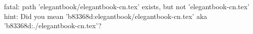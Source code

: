 fatal: path 'elegantbook/elegantbook-cn.tex' exists, but not 'elegantbook-cn.tex'
hint: Did you mean 'b83368d:elegantbook/elegantbook-cn.tex' aka 'b83368d:./elegantbook-cn.tex'?
